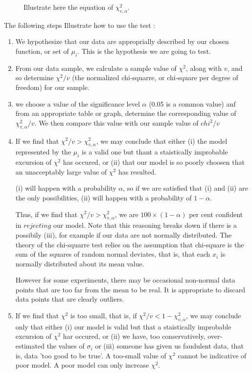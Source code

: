\documentclass[a4paper,10pt]{article}
\begin{document}
 \begin{figure}
  
  \caption{Illustrate here the equation of $\chi^2_{v,\alpha}$. }
 \end{figure}

The following steps Illustrate how to use the test : 
\begin{enumerate}
 \item We hypothesize that our data are approprially described by our chosen function, or set of $\mu_i$. This is the hypothesis 
 we are going to test. 
 
 \item From our data sample, we calculate a sample value of $\chi^2$, along with $v$, and so determine $\chi^2/v$ (the normalized chi-squarre, or chi-square per degree of freedom) for our sample. 
 
 \item we choose a value of the significance level $\alpha$ (0.05 is a common value) anf from an appropriate table or graph, determine the corresponding
 value of $\chi^2_{v,\alpha}/v$. We then compare this value with our sample value of $chi^2/v$
 
 \item If we find that $\chi^2/v > \chi^2_{v,\alpha}$, we may conclude that either (i) the model represented by the $\mu_i$ is a valid one but thant a staistically
 improbable excursion of $\chi^2$ has occured, or (ii) that our model is so poorly choosen that an unacceptably large value of $\chi^2$ has resulted.
 
 (i) will happen with a probability $\alpha$, so if we are satisfied that (i) and (ii) are the only possibilities, (ii) will happen with a probability of $1 - \alpha$.
 
 Thus, if we find that $\chi^2/v > \chi^2_{v,\alpha}$, we are $100 \times (1 - \alpha)$ per cent confident in $rejecting$ our model.
 Note that this reasoning breaks down if there is a possibily (iii), for example if our data are not normally distributed. The theory of the chi-squarre test
 relies on the assumption that chi-square is the sum of the squares of random normal deviates, that is, that each $x_i$ is normally distributed about its mean value. 
 
However for some experiments, there may be occasional non-normal data points that are too far from the mean to be real. It is appropriate to discard data points
that are clearly outliers. 


\item If we find that $\chi^2$ is too small, that is, if $\chi^2/v < 1-\chi^2_{v,\alpha}$, we may conclude only that either (i) our model is valid but that
a staistically improbable excursion of $\chi^2$ har occured, or (ii) we have, too conservatively, over-estimated the values of $\sigma_i$ or (iii) someone has given us faudulent data, that is, data 'too good to be true'. 
A too-small value of $\chi^2$ cannot be indicative of poor model. A poor model can only increase $\chi^2$.
 
\end{enumerate}

 
\end{document}
